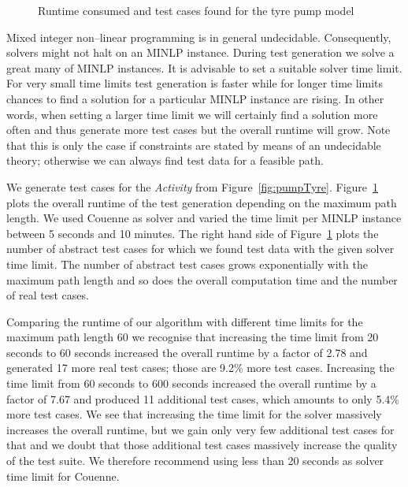 \documentclass[runningheads,a4paper]{llncs}%
\newcommand{\UMLType}[1]{\textsf{\textit{#1}}} %
\begin{document}
\begin{figure}
%
\caption{Runtime consumed and test cases found for the tyre pump model%
}%
\label{fig:ExplodingTyresRuntime}%
\end{figure}%
Mixed integer non--linear programming is in general undecidable. Consequently,
solvers might not halt on an MINLP instance. During test generation we solve
a great many of MINLP instances. It is advisable to set a suitable solver time limit.
For very small time limits test generation is faster while for longer time
limits chances to find a solution for a particular MINLP instance are rising. In
other words, when setting a larger time limit we will certainly find a solution
more often and thus generate more test cases but the overall runtime will grow.
Note that this is only the case if constraints are stated by means of an
undecidable theory; otherwise we can always find test data for a feasible path.

We generate test cases for the \UMLType{Activity} from
Figure~\ref{fig:pumpTyre}. Figure~\ref{fig:ExplodingTyresRuntime} plots the
overall runtime of the test generation depending on the maximum path length. We
used Couenne as solver and varied the time limit per MINLP instance between 5
seconds and 10 minutes. The right hand side of
Figure~\ref{fig:ExplodingTyresRuntime} plots the number of abstract test cases
for which we found test data with the given solver time limit. The number of
abstract test cases grows exponentially with the maximum path length and so does
the overall computation time and the number of real test cases.

Comparing the runtime of our algorithm with different time limits for the
maximum path length 60 we recognise that increasing the time limit from 20
seconds to 60 seconds increased the overall runtime by a factor of 2.78 and
generated 17 more real test cases; those are 9.2\% more test cases. Increasing
the time limit from 60 seconds to 600 seconds increased the overall runtime by a
factor of 7.67 and produced 11 additional test cases, which amounts to only
5.4\% more test cases. We see that increasing the time limit for the solver
massively increases the overall runtime, but we gain only very few additional
test cases for that and we doubt that those additional test cases massively
increase the quality of the test suite. We therefore recommend using less than
20 seconds as solver time limit for Couenne.
%
\end{document}
